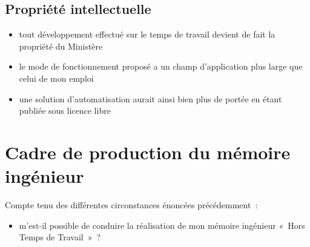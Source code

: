 \documentclass[10pt]{article}
\newenvironment{itmz}{\begin{itemize}
\setlength{\itemsep}{0em}
}{\end{itemize}}
\begin{document}
\subsection{Propriété intellectuelle}

\begin{itmz}
\item{tout développement effectué sur le temps de travail devient de fait la propriété du Ministère}
\item{le mode de fonctionnement proposé a un champ d’application plus large que celui de mon emploi}
\item{une solution d’automatisation aurait ainsi bien plus de portée en étant publiée sous licence libre}
\end{itmz}

\section{Cadre de production du mémoire ingénieur}

Compte tenu des différentes circonstances énoncées précédemment :
\begin{itmz}
\item{m’est-il possible de conduire la réalisation de mon mémoire ingénieur « Hors Temps de Travail » ?}
\end{itmz}
\end{document}
